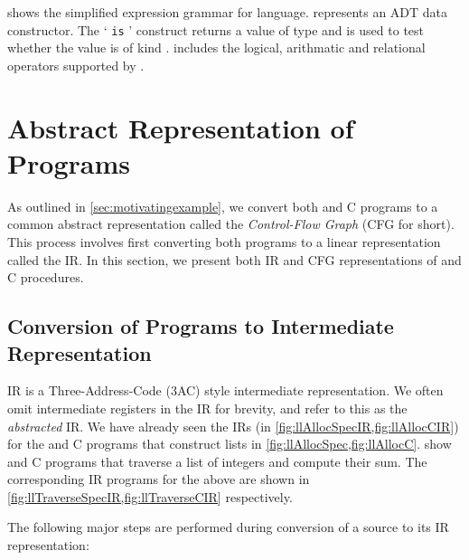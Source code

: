 

 shows the simplified expression grammar for \SpecL{} language.
 represents an ADT data constructor.
The ` {\tt is} ' construct returns a value of  type and is used to test whether
the value  is of kind .
 includes the logical, arithmatic and relational operators supported by \SpecL{}.



\section{Abstract Representation of Programs}
\label{sec:ir}
As outlined in \cref{sec:motivatingexample}, we convert both \SpecL{} and C programs to a common
abstract representation called the {\em Control-Flow Graph} (CFG for short).
This process involves first converting both programs to a linear representation called the IR.
In this section, we present both IR and CFG representations of \SpecL{} and C procedures.

\subsection{Conversion of Programs to Intermediate Representation}
\label{sec:irconv}
IR is a Three-Address-Code (3AC) style intermediate representation.
We often omit intermediate registers in the IR for brevity, and refer to this as the {\em abstracted} IR.
We have already seen the IRs (in \cref{fig:llAllocSpecIR,fig:llAllocCIR}) for the \SpecL{} and C programs
that construct lists in \cref{fig:llAllocSpec,fig:llAllocC}.
 show \SpecL{} and C programs that traverse a list of integers
and compute their sum.
The corresponding IR programs for the above are shown in \cref{fig:llTraverseSpecIR,fig:llTraverseCIR} respectively.

The following major steps are performed during conversion of a \SpecL{} source to its IR representation:

